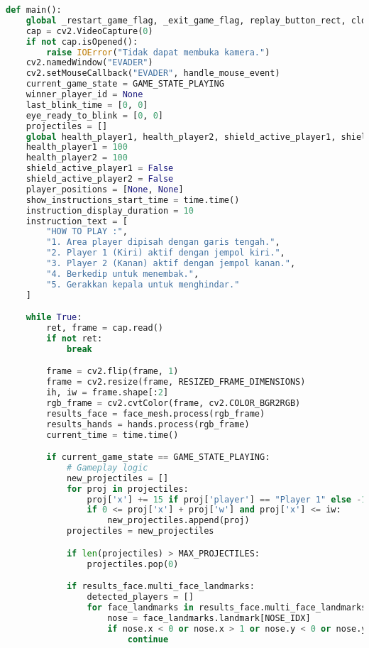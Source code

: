 \documentclass[11pt,a4paper]{article}
\begin{document}
\begin{lstlisting}[language=Python, caption=fungsi main]
def main():
    global _restart_game_flag, _exit_game_flag, replay_button_rect, close_button_rect
    cap = cv2.VideoCapture(0)
    if not cap.isOpened():
        raise IOError("Tidak dapat membuka kamera.")
    cv2.namedWindow("EVADER")
    cv2.setMouseCallback("EVADER", handle_mouse_event)
    current_game_state = GAME_STATE_PLAYING
    winner_player_id = None
    last_blink_time = [0, 0]
    eye_ready_to_blink = [0, 0]
    projectiles = []
    global health_player1, health_player2, shield_active_player1, shield_active_player2
    health_player1 = 100
    health_player2 = 100
    shield_active_player1 = False
    shield_active_player2 = False
    player_positions = [None, None]
    show_instructions_start_time = time.time()
    instruction_display_duration = 10
    instruction_text = [
        "HOW TO PLAY :",
        "1. Area player dipisah dengan garis tengah.",
        "2. Player 1 (Kiri) aktif dengan jempol kiri.",
        "3. Player 2 (Kanan) aktif dengan jempol kanan.",
        "4. Berkedip untuk menembak.",
        "5. Gerakkan kepala untuk menghindar."
    ]

    while True:
        ret, frame = cap.read()
        if not ret:
            break

        frame = cv2.flip(frame, 1)
        frame = cv2.resize(frame, RESIZED_FRAME_DIMENSIONS)
        ih, iw = frame.shape[:2]
        rgb_frame = cv2.cvtColor(frame, cv2.COLOR_BGR2RGB)
        results_face = face_mesh.process(rgb_frame)
        results_hands = hands.process(rgb_frame)
        current_time = time.time()

        if current_game_state == GAME_STATE_PLAYING:
            # Gameplay logic
            new_projectiles = []
            for proj in projectiles:
                proj['x'] += 15 if proj['player'] == "Player 1" else -15
                if 0 <= proj['x'] + proj['w'] and proj['x'] <= iw:
                    new_projectiles.append(proj)
            projectiles = new_projectiles

            if len(projectiles) > MAX_PROJECTILES:
                projectiles.pop(0)

            if results_face.multi_face_landmarks:
                detected_players = []
                for face_landmarks in results_face.multi_face_landmarks[:2]:
                    nose = face_landmarks.landmark[NOSE_IDX]
                    if nose.x < 0 or nose.x > 1 or nose.y < 0 or nose.y > 1:
                        continue


\end{lstlisting}
\end{document}
